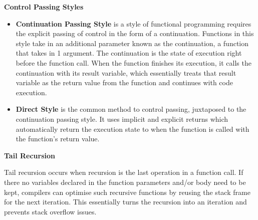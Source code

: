 \begin{center}
     \textbf{Control Passing Styles}
\end{center}
\begin{itemize}
    \item \textbf{Continuation Passing Style} is a style of functional programming requires the explicit passing of control in the form of a continuation. Functions in this style take in an additional parameter known as the continuation, a function that takes in 1 argument. The continuation is the state of execution right before the function call. When the function finishes its execution, it calls the continuation with its result variable, which essentially treats that result variable as the return value from the function and continues with code execution.
    \item \textbf{Direct Style} is the common method to control passing, juxtaposed to the continuation passing style. It uses implicit and explicit returns which automatically return the execution state to when the function is called with the function's return value.
\end{itemize}

\begin{center}
     \textbf{Tail Recursion}
\end{center}
    Tail recursion occurs when recursion is the last operation in a function call. If there no variables declared in the function parameters and/or body need to be kept, compilers can optimise such recursive functions by reusing the stack frame for the next iteration. This essentially turns the recursion into an iteration and prevents stack overflow issues.